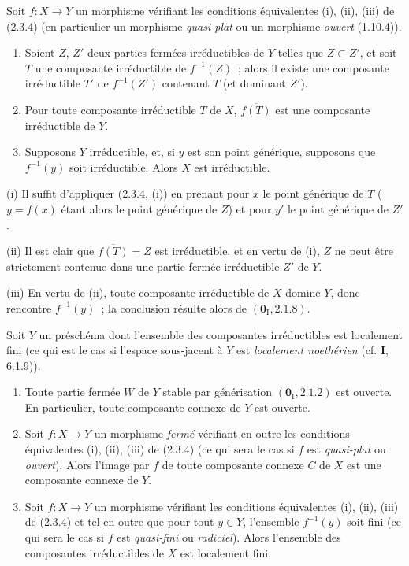 \begin{corollary}[2.3.5]
\label{IV.2.3.5-fr}
Soit $f:X\to Y$ un morphisme vérifiant les conditions équivalentes \textup{(i), (ii),
(iii)} de \textup{(2.3.4) (en particulier un morphisme \emph{quasi-plat} ou un morphisme
\emph{ouvert} (1.10.4))}.
\begin{enumerate}
  \item[\textup{(i)}] Soient $Z$, $Z'$ deux parties fermées irréductibles de $Y$ telles
  que $Z\subset Z'$, et soit $T$ une composante irréductible de $f^{-1}(Z)$~;
  alors il existe une composante irréductible $T'$ de $f^{-1}(Z')$ contenant
  $T$ (et dominant $Z'$).
  \item[\textup{(ii)}] Pour toute composante irréductible $T$ de $X$,
  $\overline{f(T)}$ est une composante irréductible de $Y$.
  \item[\textup{(iii)}] Supposons $Y$ irréductible, et, si $y$ est son point générique,
  supposons que $f^{-1}(y)$ soit irréductible. Alors $X$ est irréductible.
\end{enumerate}
\end{corollary}

(i) Il suffit d'appliquer (2.3.4, (i)) en prenant pour $x$ le point générique
de $T$ ($y=f(x)$ étant alors le point générique de $Z$) et pour $y'$ le point
générique de $Z'$.

(ii) Il est clair que $\overline{f(T)}=Z$ est irréductible, et en vertu de (i),
$Z$ ne peut être strictement contenue dans une partie fermée irréductible $Z'$
de $Y$.

(iii) En vertu de (ii), toute composante irréductible de $X$ domine $Y$, donc
rencontre $f^{-1}(y)$~; la conclusion résulte alors de
$(\mathbf{0}_{\mathrm I},2.1.8)$.

\begin{proposition}[2.3.6]
\label{IV.2.3.6-fr}
Soit $Y$ un préschéma dont l'ensemble des composantes irréductibles est
localement fini \textup{(ce qui est le cas si l'espace sous-jacent à $Y$ est
\emph{localement noethérien} (cf. \textbf{I}, 6.1.9))}.
\begin{enumerate}
  \item[\textup{(i)}] Toute partie fermée $W$ de $Y$ stable par générisation
  $(\mathbf{0}_{\mathrm I},2.1.2)$ est ouverte. En particulier, toute composante
  connexe de $Y$ est ouverte.
  \item[\textup{(ii)}] Soit $f:X\to Y$ un morphisme \emph{fermé} vérifiant en outre les
  conditions équivalentes \textup{(i), (ii), (iii)} de \textup{(2.3.4) (ce qui sera le cas si
  $f$ est \emph{quasi-plat} ou \emph{ouvert})}. Alors l'image par $f$ de toute composante
  connexe $C$ de $X$ est une composante connexe de $Y$.
  \item[\textup{(iii)}] Soit $f:X\to Y$ un morphisme vérifiant les conditions
  équivalentes \textup{(i), (ii), (iii)} de \textup{(2.3.4)} et tel en outre que pour tout
  $y\in Y$, l'ensemble $f^{-1}(y)$ soit fini \textup{(ce qui sera le cas si $f$ est
  \emph{quasi-fini} ou \emph{radiciel})}. Alors l'ensemble des composantes irréductibles de
  $X$ est localement fini.
\end{enumerate}
\end{proposition}


